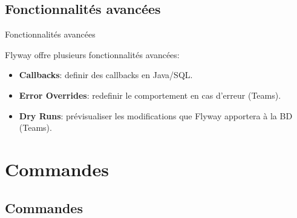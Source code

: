 \documentclass[slidestop,compress,11pt,xcolor=dvipsnames,french]{beamer}
\begin{document}
\subsection*{Fonctionnalités avancées}
\begin{frame}{Fonctionnalités avancées}

Flyway offre plusieurs fonctionnalités avancées: \\
 \begin{itemize}
  \item \textbf{Callbacks}: definir des callbacks en Java/SQL.
  \item \textbf{Error Overrides}: redefinir le comportement en cas d'erreur (Teams).
  \item \textbf{Dry Runs}: prévisualiser les modifications que Flyway apportera à la BD (Teams).
 \end{itemize}
\end{frame}

\section{Commandes}
\subsection*{Commandes}
\end{document}
